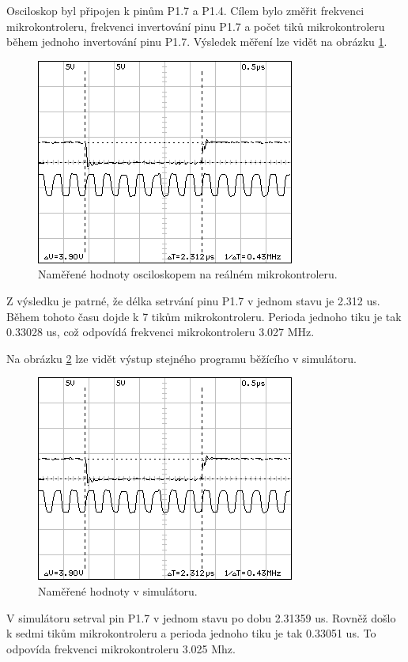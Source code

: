 Osciloskop byl připojen k pinům P1.7 a P1.4. Cílem bylo změřit frekvenci mikrokontroleru, frekvenci invertování pinu P1.7 a počet tiků mikrokontroleru během jednoho invertování pinu P1.7. Výsledek měření lze vidět na obrázku \ref{fig:dso04osc}.

\begin{figure}[ht]
\centering
\includegraphics[trim=0cm 0cm 0cm 0cm, scale=1]{fig/dso04}
\caption{Naměřené hodnoty osciloskopem na reálném mikrokontroleru.}
\label{fig:dso04osc}
\end{figure}

Z výsledku je patrné, že délka setrvání pinu P1.7 v jednom stavu je 2.312 us. Během tohoto času dojde k 7 tikům mikrokontroleru. Perioda jednoho tiku je tak 0.33028 us, což odpovídá frekvenci mikrokontroleru 3.027 MHz.

Na obrázku \ref{fig:dso04sim} lze vidět výstup stejného programu běžícího v simulátoru.

\begin{figure}[ht]
\centering
\includegraphics[trim=0cm 0cm 0cm 0cm, scale=1]{fig/dso04sim}
\caption{Naměřené hodnoty v simulátoru.}
\label{fig:dso04sim}
\end{figure}

V simulátoru setrval pin P1.7 v jednom stavu po dobu 2.31359 us. Rovněž došlo k sedmi tikům mikrokontroleru a perioda jednoho tiku je tak 0.33051 us. To odpovída frekvenci mikrokontroleru 3.025 Mhz.

